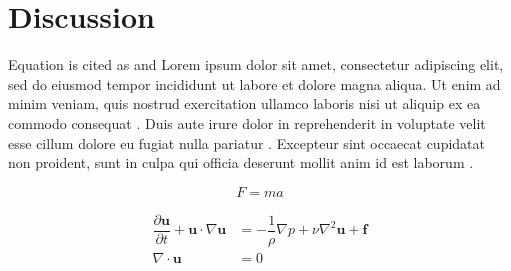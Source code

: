 \chapter{Discussion}
\label{chap:discussion}

Equation is cited as  and 
Lorem ipsum dolor sit amet, consectetur adipiscing elit, sed do eiusmod tempor incididunt ut labore et dolore magna aliqua. Ut enim ad minim veniam, quis nostrud exercitation ullamco laboris nisi ut aliquip ex ea commodo consequat \textcite{ref1}. Duis aute irure dolor in reprehenderit in voluptate velit esse cillum dolore eu fugiat nulla pariatur \textcite{ref2}. Excepteur sint occaecat cupidatat non proident, sunt in culpa qui officia deserunt mollit anim id est laborum \textcite{ref3}.

\begin{equation}
	F=ma
	\label{eq:fma}
\end{equation}

\begin{align}
    \dfrac{\partial \mathbf{u}}{\partial t} + \mathbf{u} \cdot \nabla \mathbf{u} 
        &= -\dfrac{1}{\rho} \nabla p +  \nu \nabla^2 \mathbf{u} + \mathbf{f} \\
	\nabla \cdot \mathbf{u} &= 0
	\label{eq:ns-eq}
\end{align}

